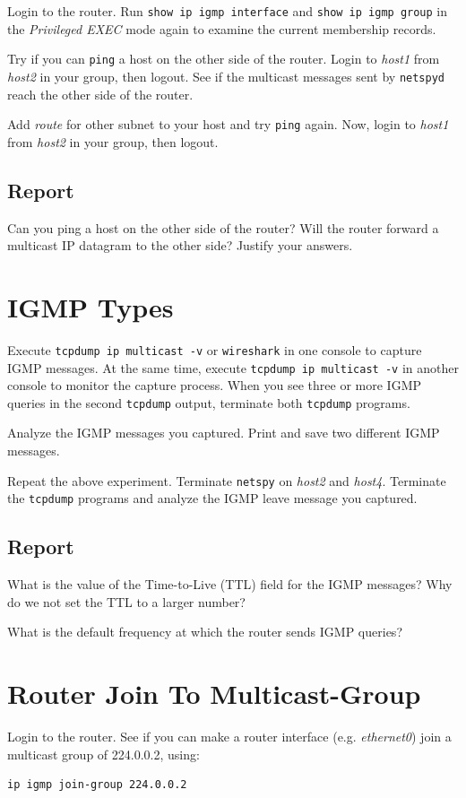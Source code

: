 \documentclass{../UTNetLab}
\begin{document}
    Login to the router.
    Run \lstinline[language={cisco}]{show ip igmp interface} and \lstinline[language={cisco}]{show ip igmp group} in the \textit{Privileged EXEC} mode again to examine the current membership records.

    Try if you can \lstinline{ping} a host on the other side of the router.
    Login to \textit{host1} from \textit{host2} in your group, then logout.
    See if the multicast messages sent by \lstinline{netspyd} reach the other side of the router.

    Add \textit{route} for other subnet to your host and try \lstinline{ping} again. Now, login to \textit{host1} from \textit{host2} in your group, then logout.
    
    \subsection*{Report}
    Can you ping a host on the other side of the router?
    Will the router forward a multicast IP datagram to the other side?
    Justify your answers.

\section{IGMP Types}
    Execute \lstinline{tcpdump ip multicast -v} or \lstinline{wireshark} in one console to capture IGMP messages.
    At the same time, execute \lstinline{tcpdump ip multicast -v} in another console to monitor the capture process.
    When you see three or more IGMP queries in the second \lstinline{tcpdump} output, terminate both \lstinline{tcpdump} programs.

    Analyze the IGMP messages you captured.
    Print and save two different IGMP messages.

    Repeat the above experiment.
    Terminate \lstinline{netspy} on \textit{host2} and \textit{host4}.
    Terminate the \lstinline{tcpdump} programs and analyze the IGMP leave message you captured.
    
    \subsection*{Report}
    What is the value of the Time-to-Live (TTL) field for the IGMP messages?
    Why do we not set the TTL to a larger number?

    What is the default frequency at which the router sends IGMP queries?

\section{Router Join To Multicast-Group}
    Login to the router.
    See if you can make a router interface (e.g. \textit{ethernet0}) join a multicast group of 224.0.0.2, using:
    \begin{lstlisting}[language={cisco}]
ip igmp join-group 224.0.0.2
    \end{lstlisting}
    
\end{document}
